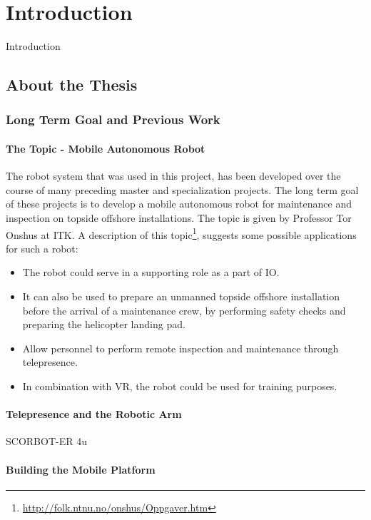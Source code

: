 \chapter{Introduction}
\label{chp:introduction} 

Introduction
\section{About the Thesis}

\subsection{Long Term Goal and Previous Work}

\subsubsection{The Topic - Mobile Autonomous Robot}

The robot system that was used in this project, has been developed over the course of many preceding master and specialization projects. The long term goal of these projects is to develop a mobile autonomous robot for maintenance and inspection on topside offshore installations. The topic is given by Professor Tor Onshus at \ac{ITK}. A description of this topic\footnote{\url{http://folk.ntnu.no/onshus/Oppgaver.htm}}, suggests some possible applications for such a robot: 

\begin{itemize}
	\item The robot could serve in a supporting role as a part of \ac{IO}.
	\item It can also be used to prepare an unmanned topside offshore installation before the arrival of a maintenance crew, by performing safety checks and preparing the helicopter landing pad.  
	\item Allow personnel to perform remote inspection and maintenance through telepresence.
	\item  In combination with \ac{VR}, the robot could be used for training purposes. 
\end{itemize}

\subsubsection{Telepresence and the Robotic Arm}

SCORBOT-ER 4u

\subsubsection{Building the Mobile Platform}


